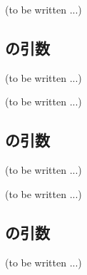 




(to be written ...)


\subsection{\MXOThickness の引数\TBW}
(to be written ...)



\clearpage
(to be written ...)


\subsection{\MYOThickness の引数\TBW}
(to be written ...)



\clearpage
(to be written ...)


\subsection{\MXOface の引数\TBW}
(to be written ...)



